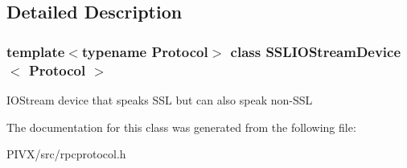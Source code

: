 \subsection{Detailed Description}
\subsubsection*{template$<$typename Protocol$>$\newline
class S\+S\+L\+I\+O\+Stream\+Device$<$ Protocol $>$}

I\+O\+Stream device that speaks S\+SL but can also speak non-\/\+S\+SL 

The documentation for this class was generated from the following file\+:\begin{DoxyCompactItemize}
\item 
P\+I\+V\+X/src/rpcprotocol.\+h\end{DoxyCompactItemize}
